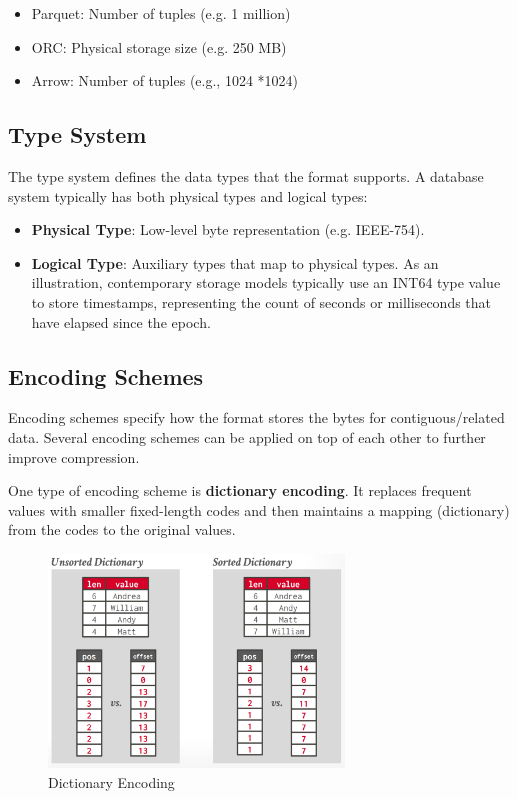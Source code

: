\documentclass[11pt]{article}
\begin{document}
\begin{itemize}
    \item Parquet: Number of tuples (e.g. 1 million)
    \item ORC: Physical storage size (e.g. 250 MB)
    \item Arrow: Number of tuples (e.g., 1024 *1024)
\end{itemize}

\subsection*{Type System}

The type system defines the data types that the format supports. A database system typically has both physical types and logical types:

\begin{itemize}
    \item \textbf{Physical Type}: Low-level byte representation (e.g. IEEE-754).
    \item \textbf{Logical Type}: Auxiliary types that map to physical types. As an illustration, contemporary storage models typically use an INT64 type value to store timestamps, representing the count of seconds or milliseconds that have elapsed since the epoch.
\end{itemize}

\subsection*{Encoding Schemes}

Encoding schemes specify how the format stores the bytes for contiguous/related data. Several encoding schemes can be applied on top of each other to further improve compression.

One type of encoding scheme is \textbf{dictionary encoding}. It replaces frequent values with smaller fixed-length codes and then maintains a mapping (dictionary) from the codes to the original values.

\begin{figure}[htbp]
    \centering
    \includegraphics[width=0.7\textwidth]{fig/dict-encoding.pdf}
    \caption{Dictionary Encoding}
\end{figure}
\end{document}
